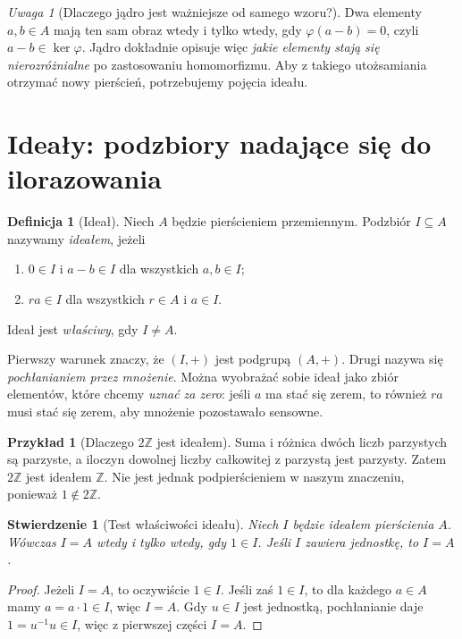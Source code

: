 \documentclass[11pt,a4paper,openany]{report}
\numberwithin{equation}{section}
\theoremstyle{plain}
\newtheorem{stwierdzenie}[twierdzenie]{Stwierdzenie}
\theoremstyle{definition}
\newtheorem{definicja}[twierdzenie]{Definicja}
\newtheorem{przyklad}[twierdzenie]{Przykład}
\theoremstyle{remark}
\newtheorem{uwaga}[twierdzenie]{Uwaga}
\newcommand{\Z}{\mathbb Z}
\newcommand{\kerf}{\operatorname{ker}}
\begin{document}
\begin{uwaga}[Dlaczego jądro jest ważniejsze od samego wzoru?]
Dwa elementy $a,b\in A$ mają ten sam obraz wtedy i tylko wtedy, gdy
$\varphi(a-b)=0$, czyli $a-b\in\kerf\varphi$.
Jądro dokładnie opisuje więc \emph{jakie elementy stają się
nierozróżnialne} po zastosowaniu homomorfizmu. Aby z takiego
utożsamiania otrzymać nowy pierścień, potrzebujemy pojęcia ideału.
\end{uwaga}

\section{Ideały: podzbiory nadające się do ilorazowania}

\begin{definicja}[Ideał]
Niech $A$ będzie pierścieniem przemiennym. Podzbiór $I\subseteq A$
nazywamy \emph{ideałem}, jeżeli
\begin{enumerate}[label=(I\arabic*)]
\item $0\in I$ i $a-b\in I$ dla wszystkich $a,b\in I$;
\item $ra\in I$ dla wszystkich $r\in A$ i $a\in I$.
\end{enumerate}
Ideał jest \emph{właściwy}, gdy $I\ne A$.
\end{definicja}

Pierwszy warunek znaczy, że $(I,+)$ jest podgrupą $(A,+)$.
Drugi nazywa się \emph{pochłanianiem przez mnożenie}.
Można wyobrażać sobie ideał jako zbiór elementów, które chcemy
\emph{uznać za zero}: jeśli $a$ ma stać się zerem, to również
$ra$ musi stać się zerem, aby mnożenie pozostawało sensowne.

\begin{przyklad}[Dlaczego $2\Z$ jest ideałem]
Suma i różnica dwóch liczb parzystych są parzyste,
a iloczyn dowolnej liczby całkowitej z parzystą jest parzysty.
Zatem $2\Z$ jest ideałem $\Z$. Nie jest jednak podpierścieniem
w naszym znaczeniu, ponieważ $1\notin2\Z$.
\end{przyklad}

\begin{stwierdzenie}[Test właściwości ideału]
Niech $I$ będzie ideałem pierścienia $A$. Wówczas
$I=A$ wtedy i tylko wtedy, gdy $1\in I$.
Jeśli $I$ zawiera jednostkę, to $I=A$.
\end{stwierdzenie}
\begin{proof}
Jeżeli $I=A$, to oczywiście $1\in I$. Jeśli zaś $1\in I$,
to dla każdego $a\in A$ mamy $a=a\cdot1\in I$, więc $I=A$.
Gdy $u\in I$ jest jednostką, pochłanianie daje
$1=u^{-1}u\in I$, więc z pierwszej części $I=A$.
\end{proof}
\end{document}
